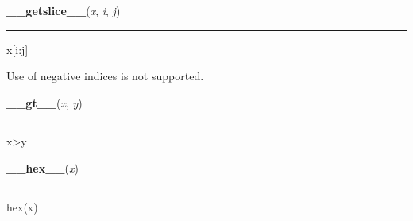     \label{pygame:Color:__getslice__}

    \vspace{0.5ex}

\hspace{.8\funcindent}\begin{boxedminipage}{\funcwidth}

    \raggedright \textbf{\_\_getslice\_\_}(\textit{x}, \textit{i}, \textit{j})

    \vspace{-1.5ex}

    \rule{\textwidth}{0.5\fboxrule}
\setlength{\parskip}{2ex}
    x[i:j]

    Use of negative indices is not supported.

\setlength{\parskip}{1ex}
    \end{boxedminipage}

    \label{pygame:Color:__gt__}

    \vspace{0.5ex}

\hspace{.8\funcindent}\begin{boxedminipage}{\funcwidth}

    \raggedright \textbf{\_\_gt\_\_}(\textit{x}, \textit{y})

    \vspace{-1.5ex}

    \rule{\textwidth}{0.5\fboxrule}
\setlength{\parskip}{2ex}
    x{\textgreater}y

\setlength{\parskip}{1ex}
    \end{boxedminipage}

    \label{pygame:Color:__hex__}

    \vspace{0.5ex}

\hspace{.8\funcindent}\begin{boxedminipage}{\funcwidth}

    \raggedright \textbf{\_\_hex\_\_}(\textit{x})

    \vspace{-1.5ex}

    \rule{\textwidth}{0.5\fboxrule}
\setlength{\parskip}{2ex}
    hex(x)

\setlength{\parskip}{1ex}
    \end{boxedminipage}

